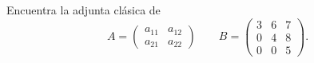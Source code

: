 \documentclass[12pt,a4paper]{article}
\begin{document}
    \begin{problema}
        Encuentra la adjunta clásica de
        \begin{equation*}
            A=
            \begin{pmatrix}
                a_{11} & a_{12}\\
                a_{21} & a_{22}
            \end{pmatrix}
            \qquad
            B=
            \begin{pmatrix}
                3 & 6 & 7\\
                0 & 4 & 8\\
                0 & 0 & 5
            \end{pmatrix}.
        \end{equation*}
    \end{problema}
\end{document}
